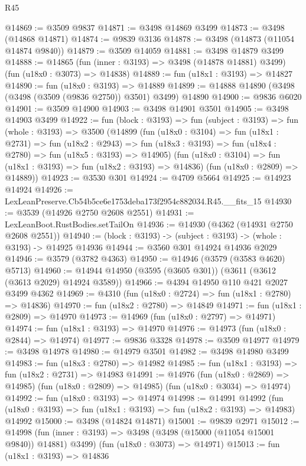 \begin{lexlean}{R45}
\begin{coremodule}
@14869 := @3509 @9837
@14871 := @3498 @14869 @3499
@14873 := @3498 (@14868 @14871)
@14874 := @9839 @3136
@14878 := @3498 (@14873 (@11054 @14874 @9840))
@14879 := @3509 @14059
@14881 := @3498 @14879 @3499
@14888 := @14865
    (fun (inner : @3193) => @3498 (@14878 @14881) @3499)
    (fun (u18x0 : @3073) => @14838)
@14889 := fun (u18x1 : @3193) => @14827
@14890 := fun (u18x0 : @3193) => @14889
@14899 := @14888 @14890 (@3498 (@3498 (@3509 (@9836 @2750)) @3501) @3499) @14890
@14900 := @9836 @6020
@14901 := @3509 @14900
@14903 := @3498 @14901 @3501
@14905 := @3498 @14903 @3499
@14922 := fun (block : @3193) =>
  fun (subject : @3193) =>
  fun (whole : @3193) =>
  @3500
    (@14899
      (fun (u18x0 : @3104) =>
      fun (u18x1 : @2731) =>
      fun (u18x2 : @2943) =>
      fun (u18x3 : @3193) => fun (u18x4 : @2780) => fun (u18x5 : @3193) => @14905)
      (fun (u18x0 : @3104) => fun (u18x1 : @3193) => fun (u18x2 : @3193) => @14836)
      (fun (u18x0 : @2809) => @14889))
@14923 := @3530 @301
@14924 := @4709 @5664
@14925 := @14923 @14924
@14926 := LexLeanPreserve.Cb54b5ce6e1753deba173f2954c882034.R45.__fits_15
@14930 := @3539 (@14926 @2750 @2608 @2551)
@14931 := LexLeanBoot.RustBodies.setTailOn
@14936 := @14930 (@4362 (@14931 @2750 @2608 @2551))
@14940 := (block : @3193) -> (subject : @3193) -> (whole : @3193) -> @14925 @14936
@14944 := @3560 @301 @14924 @14936 @2029
@14946 := @3579 (@3782 @4363)
@14950 := @14946 (@3579 (@3583 @4620) @5713)
@14960 := @14944 @14950 (@3595 (@3605 @301)) (@3611 (@3612 (@3613 @2029) @14924 @3589))
@14966 := @4394 @14950 @110 @421 @2027 @3499 @4362
@14969 := @4310 (fun (u18x0 : @2724) => fun (u18x1 : @2780) => @14836)
@14970 := fun (u18x2 : @2780) => @14849
@14971 := fun (u18x1 : @2809) => @14970
@14973 := @14969 (fun (u18x0 : @2797) => @14971)
@14974 := fun (u18x1 : @3193) => @14970
@14976 := @14973 (fun (u18x0 : @2844) => @14974)
@14977 := @9836 @3328
@14978 := @3509 @14977
@14979 := @3498 @14978
@14980 := @14979 @3501
@14982 := @3498 @14980 @3499
@14983 := fun (u18x3 : @2780) => @14982
@14985 := fun (u18x1 : @3193) => fun (u18x2 : @2731) => @14983
@14991 := @14976
    (fun (u18x0 : @2869) => @14985)
    (fun (u18x0 : @2809) => @14985)
    (fun (u18x0 : @3034) => @14974)
@14992 := fun (u18x0 : @3193) => @14974
@14998 := @14991
    @14992
    (fun (u18x0 : @3193) => fun (u18x1 : @3193) => fun (u18x2 : @3193) => @14983)
    @14992
@15000 := @3498 (@14824 @14871)
@15001 := @9839 @2971
@15012 := @14998
    (fun (inner : @3193) => @3498 (@3498 (@15000 (@11054 @15001 @9840)) @14881) @3499)
    (fun (u18x0 : @3073) => @14971)
@15013 := fun (u18x1 : @3193) => @14836

\end{coremodule}
\end{lexlean}
